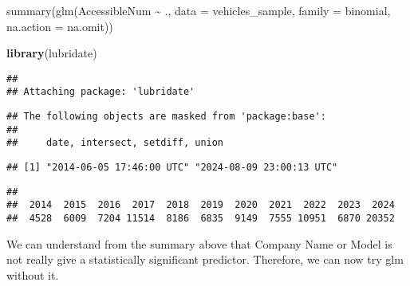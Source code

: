 \documentclass[
]{article}
\newenvironment{Shaded}{\begin{snugshade}}{\end{snugshade}}
\newcommand{\AttributeTok}[1]{\textcolor[rgb]{0.13,0.29,0.53}{#1}}
\newcommand{\ConstantTok}[1]{\textcolor[rgb]{0.56,0.35,0.01}{#1}}
\newcommand{\FunctionTok}[1]{\textcolor[rgb]{0.13,0.29,0.53}{\textbf{#1}}}
\newcommand{\NormalTok}[1]{#1}
\newcommand{\OtherTok}[1]{\textcolor[rgb]{0.56,0.35,0.01}{#1}}
\newcommand{\SpecialCharTok}[1]{\textcolor[rgb]{0.81,0.36,0.00}{\textbf{#1}}}
\newcommand{\StringTok}[1]{\textcolor[rgb]{0.31,0.60,0.02}{#1}}
\begin{document}
summary(glm(AccessibleNum \textasciitilde{} ., data = vehicles\_sample,
family = binomial, na.action = na.omit))

\begin{Shaded}
\begin{Highlighting}[]
\FunctionTok{library}\NormalTok{(lubridate)}
\end{Highlighting}
\end{Shaded}

\begin{verbatim}
## 
## Attaching package: 'lubridate'
\end{verbatim}

\begin{verbatim}
## The following objects are masked from 'package:base':
## 
##     date, intersect, setdiff, union
\end{verbatim}

\begin{Shaded}
\end{Shaded}

\begin{verbatim}
## [1] "2014-06-05 17:46:00 UTC" "2024-08-09 23:00:13 UTC"
\end{verbatim}

\begin{Shaded}
\end{Shaded}

\begin{verbatim}
## 
##  2014  2015  2016  2017  2018  2019  2020  2021  2022  2023  2024 
##  4528  6009  7204 11514  8186  6835  9149  7555 10951  6870 20352
\end{verbatim}

We can understand from the summary above that Company Name or Model is
not really give a statistically significant predictor. Therefore, we can
now try glm without it.
\end{document}
